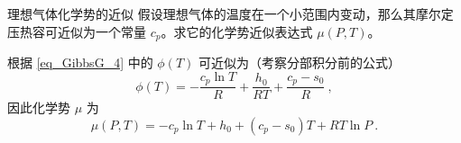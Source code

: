 \begin{example}{理想气体化学势的近似}
假设理想气体的温度在一个小范围内变动，那么其摩尔定压热容可近似为一个常量 $c_p$。求它的化学势近似表达式 $\mu(P,T)$。

根据 \autoref{eq_GibbsG_4} 中的 $\phi(T)$ 可近似为（考察分部积分前的公式）
\begin{equation}
\phi(T)=-\frac{c_p\ln T}{R}+\frac{h_0}{RT}+\frac{c_p-s_0}{R}~,
\end{equation}
因此化学势 $\mu$ 为
\begin{equation}\label{eq_GibbsG_5}
\mu(P,T)=-c_p\ln T+h_0+(c_p-s_0)T+RT\ln P~.
\end{equation}

\end{example}
